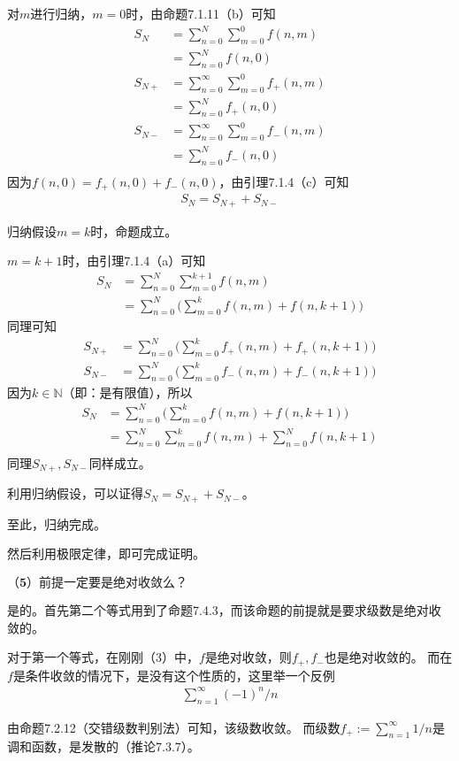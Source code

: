 \documentclass{article}
\begin{document}
对$m$进行归纳，$m = 0$时，由命题7.1.11（b）可知
\begin{align*}
    S_N    & = \sum \limits_{n=0}^N \sum \limits_{m=0}^0 f(n,m)          \\
           & = \sum \limits_{n=0}^N f(n,0)                               \\
    S_{N+} & = \sum \limits_{n=0}^\infty \sum \limits_{m=0}^0 f_{+}(n,m) \\
           & = \sum \limits_{n=0}^N f_{+}(n,0)                           \\
    S_{N-} & = \sum \limits_{n=0}^\infty \sum \limits_{m=0}^0 f_{-}(n,m) \\
           & = \sum \limits_{n=0}^N f_{-}(n,0)                           \\
\end{align*}
因为$f(n,0) = f_{+}(n,0) + f_{-}(n,0)$，由引理7.1.4（c）可知
\begin{align*}
    S_N = S_{N+} + S_{N-}
\end{align*}

归纳假设$m=k$时，命题成立。

$m = k+1$时，由引理7.1.4（a）可知
\begin{align*}
    S_N & = \sum \limits_{n=0}^N \sum \limits_{m=0}^{k+1} f(n,m)                       \\
        & = \sum \limits_{n=0}^N \big (\sum \limits_{m=0}^{k} f(n,m) + f(n,k+1) \big )
\end{align*}
同理可知
\begin{align*}
    S_{N+} & = \sum \limits_{n=0}^N \big (\sum \limits_{m=0}^{k} f_{+}(n,m) + f_{+}(n,k+1) \big ) \\
    S_{N-} & = \sum \limits_{n=0}^N \big (\sum \limits_{m=0}^{k} f_{-}(n,m) + f_{-}(n,k+1) \big )
\end{align*}
因为$k \in \mathbb{N}$（即：是有限值），所以
\begin{align*}
    S_N & = \sum \limits_{n=0}^N \big (\sum \limits_{m=0}^{k} f(n,m) + f(n,k+1) \big )         \\
        & = \sum \limits_{n=0}^N \sum \limits_{m=0}^{k} f(n,m) + \sum \limits_{n=0}^N f(n,k+1) \\
\end{align*}
同理$S_{N+},S_{N-}$同样成立。

利用归纳假设，可以证得$S_N = S_{N+} + S_{N-}$。

至此，归纳完成。

然后利用极限定律，即可完成证明。

$\textbf{（5）前提一定要是绝对收敛么？} $

是的。首先第二个等式用到了命题7.4.3，而该命题的前提就是要求级数是绝对收敛的。

对于第一个等式，在刚刚（3）中，$f$是绝对收敛，则$f_{+},f_{-}$也是绝对收敛的。
而在$f$是条件收敛的情况下，是没有这个性质的，这里举一个反例
\begin{align*}
    \sum \limits_{n=1}^\infty (-1)^n / n
\end{align*}

由命题7.2.12（交错级数判别法）可知，该级数收敛。
而级数$f_{+} := \sum \limits_{n=1}^\infty 1 / n$是调和函数，是发散的（推论7.3.7）。
\end{document}
